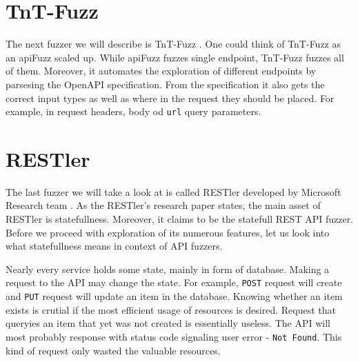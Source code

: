 \section{TnT-Fuzz}
The next fuzzer we will describe is TnT-Fuzz \cite{tntFuzzer2020github}. One could think of  TnT-Fuzz as an apiFuzz scaled up. While apiFuzz fuzzes single endpoint, TnT-Fuzz fuzzes all of them. Moreover, it automates the exploration of different endpoints by parsesing the OpenAPI specification. From the specification it also gets the correct input types as well as where in the request they should be placed. For example, in request headers, body od \texttt{url} query parameters.



\section{RESTler}
The last fuzzer we will take a look at is called RESTler developed by Microsoft Research team \cite{atlidakis2019restler}. As the RESTler's research paper states, the main asset of RESTler is statefullness. Moreover, it claims to be the statefull REST API fuzzer. Before we proceed with exploration of its numerous features, let us look into what statefullness means in context of API fuzzers.

Nearly every service holds some state, mainly in form of database. Making a request to the API may change the state. For example, \texttt{POST} request will create and \texttt{PUT} request will update an item in the database. Knowing whether an item exists is crutial if the most  efficient usage of resources is desired. Request that queryies an item that yet was not created is essentially useless. The API will most probably response with status code signaling user error - \texttt{Not Found}. This kind of request only wasted the valuable resources.

